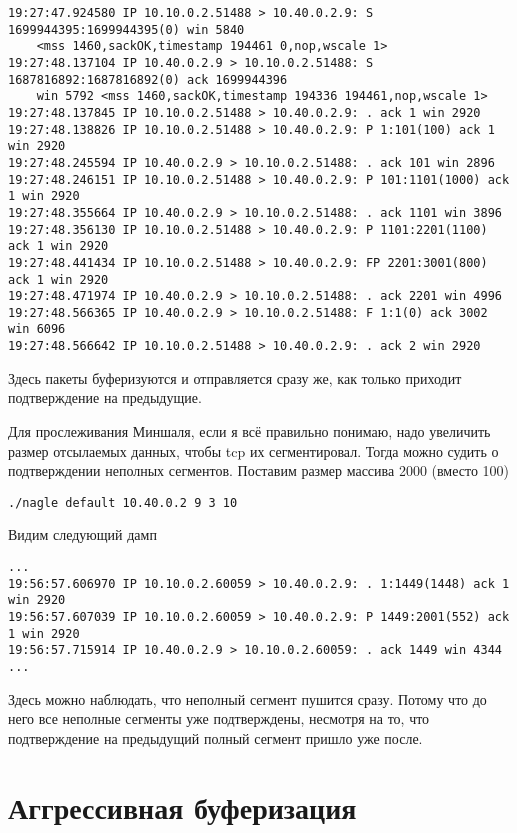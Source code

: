 \documentclass[a4paper,12pt]{article}
\begin{document}
\begin{Verbatim}
19:27:47.924580 IP 10.10.0.2.51488 > 10.40.0.2.9: S 1699944395:1699944395(0) win 5840 
	<mss 1460,sackOK,timestamp 194461 0,nop,wscale 1>
19:27:48.137104 IP 10.40.0.2.9 > 10.10.0.2.51488: S 1687816892:1687816892(0) ack 1699944396 
	win 5792 <mss 1460,sackOK,timestamp 194336 194461,nop,wscale 1>
19:27:48.137845 IP 10.10.0.2.51488 > 10.40.0.2.9: . ack 1 win 2920 
19:27:48.138826 IP 10.10.0.2.51488 > 10.40.0.2.9: P 1:101(100) ack 1 win 2920 
19:27:48.245594 IP 10.40.0.2.9 > 10.10.0.2.51488: . ack 101 win 2896 
19:27:48.246151 IP 10.10.0.2.51488 > 10.40.0.2.9: P 101:1101(1000) ack 1 win 2920 
19:27:48.355664 IP 10.40.0.2.9 > 10.10.0.2.51488: . ack 1101 win 3896 
19:27:48.356130 IP 10.10.0.2.51488 > 10.40.0.2.9: P 1101:2201(1100) ack 1 win 2920 
19:27:48.441434 IP 10.10.0.2.51488 > 10.40.0.2.9: FP 2201:3001(800) ack 1 win 2920 
19:27:48.471974 IP 10.40.0.2.9 > 10.10.0.2.51488: . ack 2201 win 4996 
19:27:48.566365 IP 10.40.0.2.9 > 10.10.0.2.51488: F 1:1(0) ack 3002 win 6096 
19:27:48.566642 IP 10.10.0.2.51488 > 10.40.0.2.9: . ack 2 win 2920 
\end{Verbatim}
Здесь пакеты буферизуются и отправляется сразу же, как только приходит подтверждение на предыдущие. 

Для прослеживания Миншаля, если я всё правильно понимаю, надо увеличить размер отсылаемых данных, чтобы tcp их сегментировал.
Тогда можно судить о подтверждении неполных сегментов. Поставим размер массива 2000 (вместо 100)

\begin{Verbatim}
./nagle default 10.40.0.2 9 3 10
\end{Verbatim}

Видим следующий дамп
\begin{Verbatim}
...
19:56:57.606970 IP 10.10.0.2.60059 > 10.40.0.2.9: . 1:1449(1448) ack 1 win 2920 
19:56:57.607039 IP 10.10.0.2.60059 > 10.40.0.2.9: P 1449:2001(552) ack 1 win 2920 
19:56:57.715914 IP 10.40.0.2.9 > 10.10.0.2.60059: . ack 1449 win 4344 
...
\end{Verbatim}
Здесь можно наблюдать, что неполный сегмент пушится сразу. Потому что до него все неполные сегменты уже подтверждены, несмотря на то,
что подтверждение на предыдущий полный сегмент пришло уже после.

\section{Аггрессивная буферизация}
\end{document}
